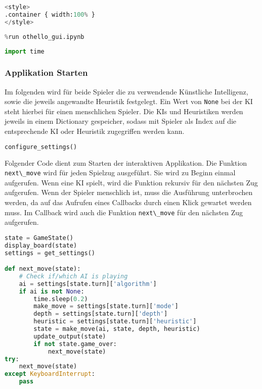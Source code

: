 \begin{lstlisting}[language=Python]
%%HTML
<style>
.container { width:100% }
</style>
\end{lstlisting}

\begin{lstlisting}[language=Python]
%run othello_ai.ipynb
%run othello_gui.ipynb
\end{lstlisting}

\begin{lstlisting}[language=Python]
import time
\end{lstlisting}

\hypertarget{applikation-starten}{%
\subsubsection{Applikation Starten}\label{applikation-starten}}

Im folgenden wird für beide Spieler die zu verwendende Künstliche
Intelligenz, sowie die jeweils angewandte Heuristik festgelegt. Ein Wert
von \passthrough{\lstinline!None!} bei der KI steht hierbei für einen
menschlichen Spieler. Die KIs und Heuristiken werden jeweils in einem
Dictionary gespeicher, sodass mit Spieler als Index auf die
entsprechende KI oder Heuristik zugegriffen werden kann.

\begin{lstlisting}[language=Python]
configure_settings()
\end{lstlisting}

Folgender Code dient zum Starten der interaktiven Applikation. Die
Funktion \passthrough{\lstinline!next\_move!} wird für jeden Spielzug
ausgeführt. Sie wird zu Beginn einmal aufgerufen. Wenn eine KI spielt,
wird die Funktion rekursiv für den nächsten Zug aufgerufen. Wenn der
Spieler menschlich ist, muss die Ausführung unterbrochen werden, da auf
das Aufrufen eines Callbacks durch einen Klick gewartet werden muss. Im
Callback wird auch die Funktion \passthrough{\lstinline!next\_move!} für
den nächsten Zug aufgerufen.

\begin{lstlisting}[language=Python]
state = GameState()
display_board(state)
settings = get_settings()

def next_move(state):
    # Check if/which AI is playing
    ai = settings[state.turn]['algorithm']
    if ai is not None:
        time.sleep(0.2)
        make_move = settings[state.turn]['mode']
        depth = settings[state.turn]['depth']
        heuristic = settings[state.turn]['heuristic']
        state = make_move(ai, state, depth, heuristic)
        update_output(state)
        if not state.game_over:
            next_move(state)
try:
    next_move(state)
except KeyboardInterrupt:
    pass
\end{lstlisting}
